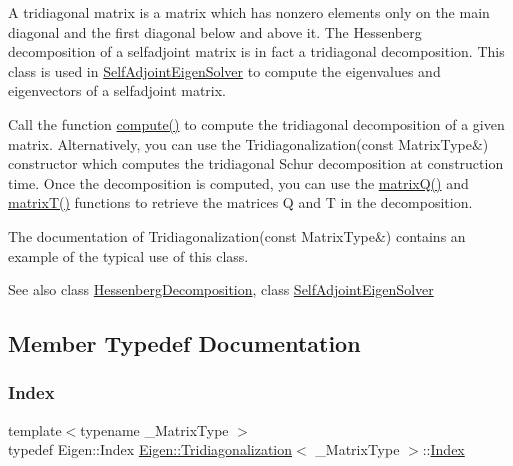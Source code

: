 A tridiagonal matrix is a matrix which has nonzero elements only on the main diagonal and the first diagonal below and above it. The Hessenberg decomposition of a selfadjoint matrix is in fact a tridiagonal decomposition. This class is used in \mbox{\hyperlink{class_eigen_1_1_self_adjoint_eigen_solver}{Self\+Adjoint\+Eigen\+Solver}} to compute the eigenvalues and eigenvectors of a selfadjoint matrix.

Call the function \mbox{\hyperlink{class_eigen_1_1_tridiagonalization_acd288abb081d3b40b87e4b98cd8f6ee9}{compute()}} to compute the tridiagonal decomposition of a given matrix. Alternatively, you can use the Tridiagonalization(const Matrix\+Type\&) constructor which computes the tridiagonal Schur decomposition at construction time. Once the decomposition is computed, you can use the \mbox{\hyperlink{class_eigen_1_1_tridiagonalization_a000f7392eda930576ffd2af1fae54af2}{matrix\+Q()}} and \mbox{\hyperlink{class_eigen_1_1_tridiagonalization_a6eb5ef94b8b9bb013c0e69b6df56d0df}{matrix\+T()}} functions to retrieve the matrices Q and T in the decomposition.

The documentation of Tridiagonalization(const Matrix\+Type\&) contains an example of the typical use of this class.

\begin{DoxySeeAlso}{See also}
class \mbox{\hyperlink{class_eigen_1_1_hessenberg_decomposition}{Hessenberg\+Decomposition}}, class \mbox{\hyperlink{class_eigen_1_1_self_adjoint_eigen_solver}{Self\+Adjoint\+Eigen\+Solver}} 
\end{DoxySeeAlso}


\subsection{Member Typedef Documentation}
\mbox{\label{class_eigen_1_1_tridiagonalization_a7bd1f9fccec1e93b77a2214b2d30aae9}} 
\subsubsection{\texorpdfstring{Index}{Index}}
{\footnotesize\ttfamily template$<$typename \+\_\+\+Matrix\+Type $>$ \\
typedef Eigen\+::\+Index \mbox{\hyperlink{class_eigen_1_1_tridiagonalization}{Eigen\+::\+Tridiagonalization}}$<$ \+\_\+\+Matrix\+Type $>$\+::\mbox{\hyperlink{class_eigen_1_1_tridiagonalization_a7bd1f9fccec1e93b77a2214b2d30aae9}{Index}}}

